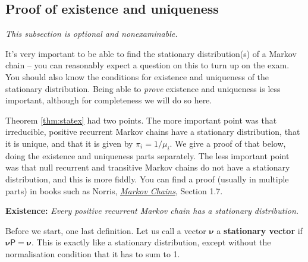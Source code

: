 \documentclass[
  a4paper,
]{article}
\theoremstyle{definition}
\theoremstyle{definition}
\theoremstyle{definition}
\theoremstyle{remark}
\begin{document}
\hypertarget{stat-proof}{%
\subsection{Proof of existence and uniqueness}\label{stat-proof}}

\emph{This subsection is optional and nonexaminable.}

It's very important to be able to find the stationary distribution(s) of a Markov chain -- you can reasonably expect a question on this to turn up on the exam. You should also know the conditions for existence and uniqueness of the stationary distribution. Being able to \emph{prove} existence and uniqueness is less important, although for completeness we will do so here.

Theorem \ref{thm:statex} had two points. The more important point was that irreducible, positive recurrent Markov chains have a stationary distribution, that it is unique, and that it is given by \(\pi_i = 1/\mu_i\). We give a proof of that below, doing the existence and uniqueness parts separately.
The less important point was that null recurrent and transitive Markov chains do not have a stationary distribution, and this is more fiddly. You can find a proof (usually in multiple parts) in books such as Norris, \href{https://www.statslab.cam.ac.uk/~james/Markov/}{\emph{Markov Chains}}, Section 1.7.

\textbf{Existence:} \emph{Every positive recurrent Markov chain has a stationary distribution.}

Before we start, one last definition. Let us call a vector \(\boldsymbol\nu\) a \textbf{stationary vector} if \(\boldsymbol\nu \mathsf P = \boldsymbol\nu\). This is exactly like a stationary distribution, except without the normalisation condition that it has to sum to 1.
\end{document}
